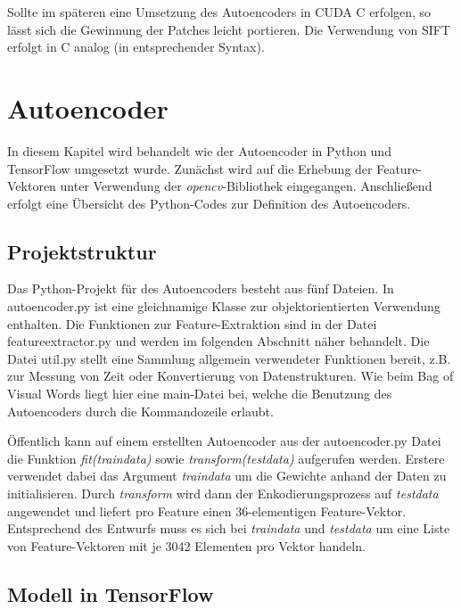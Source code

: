 Sollte im späteren eine Umsetzung des Autoencoders in CUDA C erfolgen, so lässt sich die Gewinnung der Patches leicht portieren. Die Verwendung von SIFT erfolgt in C analog (in entsprechender Syntax).

\section{Autoencoder}

In diesem Kapitel wird behandelt wie der Autoencoder in Python und TensorFlow umgesetzt wurde. Zunächst wird auf die Erhebung der Feature-Vektoren unter Verwendung der \textit{opencv}-Bibliothek eingegangen. Anschließend erfolgt eine Übersicht des Python-Codes zur Definition des Autoencoders.

\subsection{Projektstruktur} Das Python-Projekt für des Autoencoders besteht aus fünf Dateien. In autoencoder.py ist eine gleichnamige Klasse zur objektorientierten Verwendung enthalten. Die Funktionen zur Feature-Extraktion sind in der Datei feature\textunderscore extractor.py und werden im folgenden Abschnitt näher behandelt. Die Datei util.py stellt eine Sammlung allgemein verwendeter Funktionen bereit, z.B. zur Messung von Zeit oder Konvertierung von Datenstrukturen. Wie beim Bag of Visual Words liegt hier eine main-Datei bei, welche die Benutzung des Autoencoders durch die Kommandozeile erlaubt.


Öffentlich kann auf einem erstellten Autoencoder aus der autoencoder.py Datei die Funktion \textit{fit(train\textunderscore data)} sowie \textit{transform(test\textunderscore data)} aufgerufen werden. Erstere verwendet dabei das Argument \textit{train\textunderscore data} um die Gewichte anhand der Daten zu initialisieren.  Durch \textit{transform} wird dann der Enkodierungsprozess auf \textit{test\textunderscore data} angewendet und liefert pro Feature einen 36-elementigen Feature-Vektor. Entsprechend des Entwurfs muss es sich bei \textit{train\textunderscore data} und \textit{test\textunderscore data} um eine Liste von Feature-Vektoren mit je 3042 Elementen pro Vektor handeln.

\subsection{Modell in TensorFlow}

